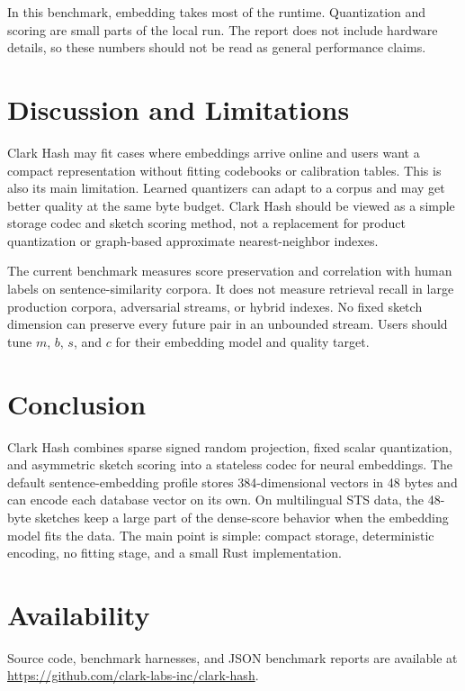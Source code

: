 \documentclass[11pt]{article}
\begin{document}
In this benchmark, embedding takes most of the runtime. Quantization and scoring are
small parts of the local run. The report does not include hardware details, so
these numbers should not be read as general performance claims.

\section{Discussion and Limitations}

Clark Hash may fit cases where embeddings arrive online and users want a compact
representation without fitting codebooks or calibration tables. This is also its
main limitation. Learned quantizers can adapt to a corpus and may get better
quality at the same byte budget. Clark Hash should be viewed as a simple storage
codec and sketch scoring method, not a replacement for product quantization or
graph-based approximate nearest-neighbor indexes.

The current benchmark measures score preservation and correlation with human
labels on sentence-similarity corpora. It does not measure retrieval recall in
large production corpora, adversarial streams, or hybrid indexes. No fixed
sketch dimension can preserve every future pair in an unbounded stream. Users
should tune $m$, $b$, $s$, and $c$ for their embedding model and quality target.

\section{Conclusion}

Clark Hash combines sparse signed random projection, fixed scalar quantization,
and asymmetric sketch scoring into a stateless codec for neural embeddings. The
default sentence-embedding profile stores 384-dimensional vectors in 48 bytes
and can encode each database vector on its own. On multilingual STS data, the
48-byte sketches keep a large part of the dense-score behavior when the
embedding model fits the data. The main point is simple: compact storage,
deterministic encoding, no fitting stage, and a small Rust implementation.

\section*{Availability}

Source code, benchmark harnesses, and JSON benchmark reports are available at
\url{https://github.com/clark-labs-inc/clark-hash}.



\end{document}

